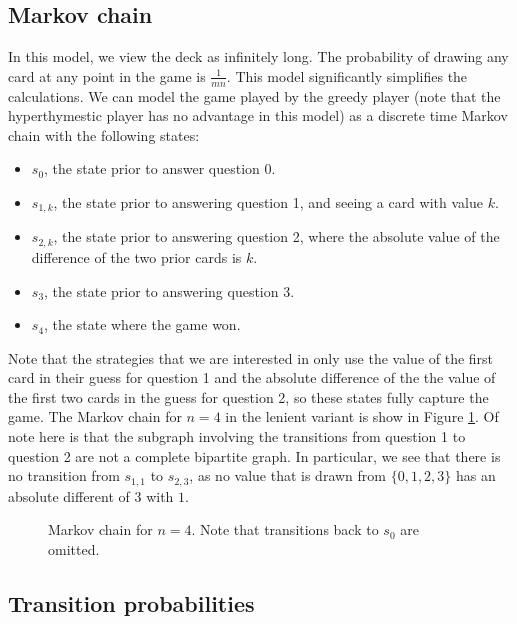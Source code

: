 \documentclass[12pt]{article}
\theoremstyle{definition}
\begin{document}
\subsection{Markov chain}
In this model, we view the deck as infinitely long. The probability of drawing any card at any point in the game is $\frac{1}{mn}$. This model significantly simplifies the calculations. We can model the game played by the greedy player (note that the hyperthymestic player has no advantage in this model) as a discrete time Markov chain with the following states:

\begin{itemize}
    \item $s_{0}$, the state prior to answer question 0.
    \item $s_{1,k}$, the state prior to answering question 1, and seeing a card with value $k$.
    \item $s_{2,k}$, the state prior to answering question 2, where the absolute value of the difference of the two prior cards is $k$.
    \item $s_{3}$, the state prior to answering question 3. 
    \item $s_{4}$, the state where the game won.
\end{itemize}

Note that the strategies that we are interested in only use the value of the first card in their guess for question 1 and the absolute difference of the the value of the first two cards in the guess for question 2, so these states fully capture the game. The Markov chain for $n=4$ in the lenient variant is show in Figure \ref{fig:mc}. Of note here is that the subgraph involving the transitions from question 1 to question 2 are not a complete bipartite graph. In particular, we see that there is no transition from $s_{1, 1}$ to $s_{2, 3}$, as no value that is drawn from $\{0,1,2, 3\}$ has an absolute different of 3 with $1$.

\begin{figure}[ht]
    \begin{center}
    
    \end{center}
    \caption{Markov chain for $n = 4$. Note that transitions back to $s_0$ are omitted.}
    \label{fig:mc}
\end{figure}

\subsection{Transition probabilities}
\end{document}
